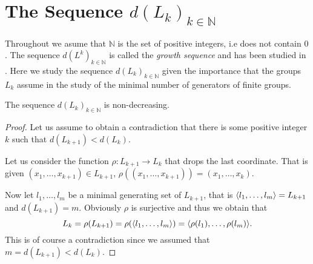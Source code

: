 \section{The Sequence \texorpdfstring{$d(L_k)_{k \in \mathbb{N}}$}{dLkN}}

Throughout we asume that $\mathbb{N}$ is the set of positive integers, i.e does not contain $0$.
The sequence $d(L^k)_{k \in \mathbb{N}}$ is called the \textit{growth sequence} and has been studied in \cite{WiegoldGSFG, WiegoldGSFGII, WiegoldGSFGIII, WiegoldGSFGIV}. Here we study the sequence $d(L_k)_{k \in \mathbb{N}}$ given the importance that the groups $L_k$ assume in the study of the minimal number of generators of finite groups. 

\begin{theorem}
    \label{S2:nondecLk}
    The sequence $d(L_k)_{k \in \mathbb{N}}$ is non-decreasing.
\end{theorem}

\begin{proof}
    Let us assume to obtain a contradiction that there is some positive integer $k$ such that $d(L_{k+1}) < d(L_k)$. 
    
    Let us consider the function $\rho: L_{k+1} \rightarrow L_k$ that drops the last coordinate. That is given $(x_1,\ldots ,x_{k+1}) \in L_{k+1}$, $\rho((x_1,\ldots ,x_{k+1})) = (x_1,\ldots ,x_k)$.

    Now let $l_1,\ldots ,l_m$ be a minimal generating set of $L_{k+1}$, that is $
    \langle l_1,\ldots ,l_m \rangle = L_{k+1}$ and $d(L_{k+1}) = m$.
    Obviously $\rho$ is surjective and thus we obtain that 
    $$
    L_k = \rho(L_{k+1}) = \rho(\langle l_1,\ldots ,l_m \rangle) = \langle \rho(l_1),\ldots ,\rho(l_m) \rangle.
    $$
    This is of course a contradiction since we assumed that $m = d(L_{k+1}) < d(L_k)$.
\end{proof}

